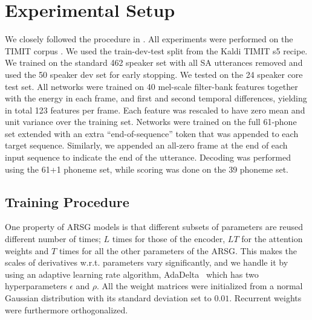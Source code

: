 \documentclass{article} %
\begin{document}
\section{Experimental Setup}
\label{sec:setup}

We closely followed the procedure in \cite{graves_2013_timit}. All experiments
were performed on the TIMIT corpus \cite{timit}. We used the train-dev-test
split from the Kaldi \cite{povey_2011} TIMIT s5 recipe. We trained on the
standard 462 speaker set with all SA utterances removed and used the 50 speaker
dev set for early stopping. We tested on the 24 speaker core test set. All
networks were trained on 40 mel-scale filter-bank features together with the
energy in each frame, and first and second temporal differences, yielding in
total 123 features per frame. Each feature was rescaled to have zero mean and
unit variance over the training set. Networks were trained on the full 61-phone
set extended with an extra ``end-of-sequence'' token that was appended to each
target sequence. Similarly, we appended an all-zero frame at the end of each
input sequence to indicate the end of the utterance. Decoding was performed
using the 61+1 phoneme set, while scoring was done on the 39 phoneme set.

\subsection{Training Procedure}

One property of ARSG models is that different subsets of parameters are reused
different number of times; $L$ times for those of the encoder, $LT$ for the
attention weights and $T$ times for all the other parameters of the ARSG.  This
makes the scales of derivatives w.r.t. parameters vary significantly, and we
handle it by using an adaptive learning rate algorithm,
AdaDelta~\cite{zeiler_2012} which has two hyperparameters $\epsilon$ and $\rho$.
All the weight matrices were initialized from a normal Gaussian distribution
with its standard deviation set to $0.01$. Recurrent weights were furthermore
orthogonalized.
\end{document}
